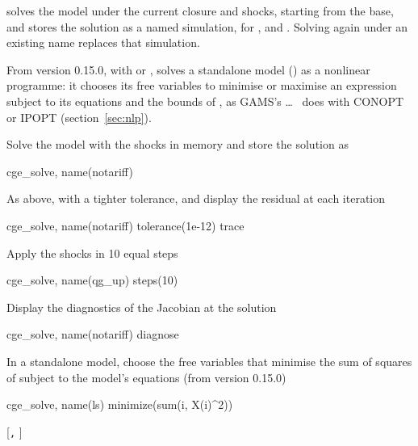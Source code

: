 

 solves the model under the current closure and shocks, starting
from the base, and stores the solution as a named simulation, for
,  and . Solving again
under an existing name replaces that simulation.

From version 0.15.0, with  or ,
 solves a standalone model () as a nonlinear
programme: it chooses its free variables to minimise or maximise an
expression subject to its equations and the bounds of , as
GAMS's  \dots\  does with CONOPT or
IPOPT (section~\ref{sec:nlp}).


Solve the model with the shocks in memory and store the solution as
\begin{stcode}
cge_solve, name(notariff)
\end{stcode}
As above, with a tighter tolerance, and display the residual at each
iteration
\begin{stcode}
cge_solve, name(notariff) tolerance(1e-12) trace
\end{stcode}
Apply the shocks in 10 equal steps
\begin{stcode}
cge_solve, name(qg_up) steps(10)
\end{stcode}
Display the diagnostics of the Jacobian at the solution
\begin{stcode}
cge_solve, name(notariff) diagnose
\end{stcode}
In a standalone model, choose the free variables that minimise the sum of
squares of  subject to the model's equations (from version 0.15.0)
\begin{stcode}
cge_solve, name(ls) minimize(sum(i, X(i)^2))
\end{stcode}


\begin{stsyntax}
 [\texttt{,} ]
\end{stsyntax}

